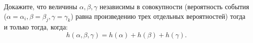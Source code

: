 Докажите, что величины $\alpha, \beta, \gamma$ независимы в совокупности (вероятность события
($\alpha = \alpha_i, \beta = \beta_j, \gamma = \gamma_k$) равна произведению трех отдельных вероятностей)
тогда и только тогда, когда:
$$
    h(\alpha, \beta, \gamma) = h(\alpha) + h(\beta) + h(\gamma).
$$